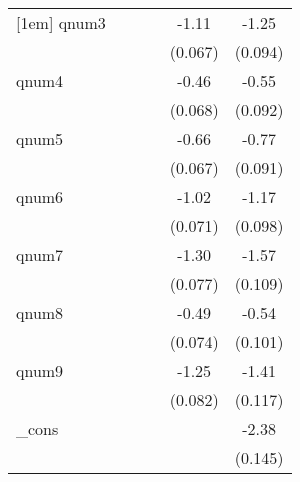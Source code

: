 {\begin{tabular}{l*{5}{c}}
[1em]
qnum3       &                     &                     &                     &       -1.11\sym{***}&       -1.25\sym{***}\\
            &                     &                     &                     &     (0.067)         &     (0.094)         \\
[1em]
qnum4       &                     &                     &                     &       -0.46\sym{***}&       -0.55\sym{***}\\
            &                     &                     &                     &     (0.068)         &     (0.092)         \\
[1em]
qnum5       &                     &                     &                     &       -0.66\sym{***}&       -0.77\sym{***}\\
            &                     &                     &                     &     (0.067)         &     (0.091)         \\
[1em]
qnum6       &                     &                     &                     &       -1.02\sym{***}&       -1.17\sym{***}\\
            &                     &                     &                     &     (0.071)         &     (0.098)         \\
[1em]
qnum7       &                     &                     &                     &       -1.30\sym{***}&       -1.57\sym{***}\\
            &                     &                     &                     &     (0.077)         &     (0.109)         \\
[1em]
qnum8       &                     &                     &                     &       -0.49\sym{***}&       -0.54\sym{***}\\
            &                     &                     &                     &     (0.074)         &     (0.101)         \\
[1em]
qnum9       &                     &                     &                     &       -1.25\sym{***}&       -1.41\sym{***}\\
            &                     &                     &                     &     (0.082)         &     (0.117)         \\
[1em]
\_cons      &                     &                     &                     &                     &       -2.38\sym{***}\\
            &                     &                     &                     &                     &     (0.145)         \\

\end{tabular}}
